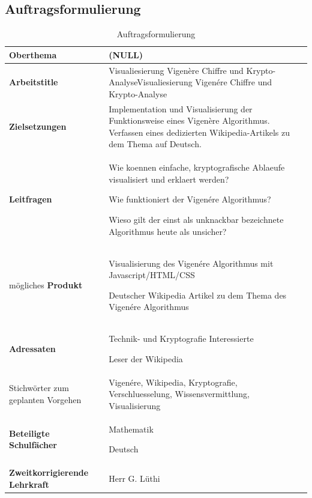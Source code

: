 \documentclass[11pt,paper=a4,final]{scrartcl}
\begin{document}
\subsection{Auftragsformulierung}
\begin{table}[h!]
  \centering
  \begin{tabular}{|p{4cm}|p{12cm}|}\hline
    \bf Oberthema & (NULL) \\ \hline
    \bf Arbeitstitle & Visualiesierung Vigenère Chiffre und
    Krypto-AnalyseVisualiesierung Vigen\'ere Chiffre und Krypto-Analyse \\
    \hline
    \bf Zielsetzungen & Implementation und Visualisierung der Funktionsweise
    eines Vigenère Algorithmus. Verfassen eines dedizierten Wikipedia-Artikels
    zu dem Thema auf Deutsch. \\ \hline
    \bf Leitfragen & \begin{itemize*} \item Wie koennen einfache, kryptografische
    Ablaeufe visualisiert und erklaert werden? \item Wie funktioniert der
    Vigen\'ere Algorithmus? \item Wieso gilt der einst als unknackbar
    bezeichnete Algorithmus heute als unsicher? \end{itemize*} \\ \hline
    m\"ogliches \bf Produkt & \begin{itemize*} \item Visualisierung des Vigen\'ere
    Algorithmus mit Javascript/HTML/CSS \item Deutscher Wikipedia Artikel zu dem
    Thema des Vigen\'ere Algorithmus \end{itemize*} \\ \hline
    \bf Adressaten & \begin{itemize*} \item Technik- und Kryptografie
    Interessierte \item Leser der Wikipedia \end{itemize*} \\ \hline
    Stichwörter zum geplanten Vorgehen & Vigen\'ere, Wikipedia, Kryptografie,
    Verschluesselung, Wissensvermittlung, Visualisierung \\ \hline
    \bf Beteiligte Schulf\"acher & \begin{itemize*} \item Mathematik \item
    Deutsch \end{itemize*} \\ \hline
    \bf Zweitkorrigierende Lehrkraft & Herr G. L\"uthi \\ \hline
  \end{tabular}
  \caption{Auftragsformulierung}
  \label{tab:auftrag}
\end{table}
\newpage
\end{document}
